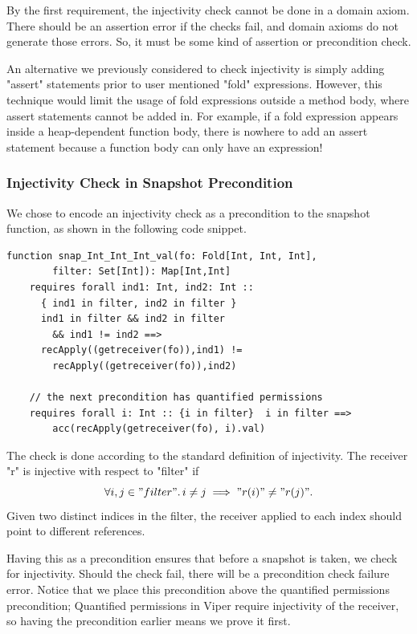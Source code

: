 \documentclass[msc,oneside]{ubcthesis}
\theoremstyle{definition}
\begin{document}
By the first requirement, the injectivity check cannot be done in a domain axiom. There should be an assertion error if the checks fail, and domain axioms do not generate those errors. So, it must be some kind of assertion or precondition check. 

An alternative we previously considered to check injectivity is simply adding "assert" statements prior to user mentioned "fold" expressions. However, this technique would limit the usage of fold expressions outside a method body, where assert statements cannot be added in. For example, if a fold expression appears inside a heap-dependent function body, there is nowhere to add an assert statement because a function body can only have an expression! 

\subsubsection{Injectivity Check in Snapshot Precondition}
We chose to encode an injectivity check as a precondition to the snapshot function, as shown in the following code snippet.
\begin{lstlisting}
function snap_Int_Int_Int_val(fo: Fold[Int, Int, Int], 
        filter: Set[Int]): Map[Int,Int]
    requires forall ind1: Int, ind2: Int ::
      { ind1 in filter, ind2 in filter }
      ind1 in filter && ind2 in filter 
        && ind1 != ind2 ==>
      recApply((getreceiver(fo)),ind1) !=
        recApply((getreceiver(fo)),ind2)
        
    // the next precondition has quantified permissions
    requires forall i: Int :: {i in filter}  i in filter ==> 
        acc(recApply(getreceiver(fo), i).val)
\end{lstlisting}
The check is done according to the standard definition of injectivity. The receiver "r" is injective with respect to "filter" if 
$$\forall i, j \in "filter" \ldotp i \neq j \implies "r(i)" \neq  "r(j)". $$
Given two distinct indices in the filter, the receiver applied to each index should point to different references. 

Having this as a precondition ensures that before a snapshot is taken, we check for injectivity. Should the check fail, there will be a precondition check failure error. Notice that we place this precondition above the quantified permissions precondition; Quantified permissions in Viper require injectivity of the receiver, so having the precondition earlier means we prove it first.
\end{document}
